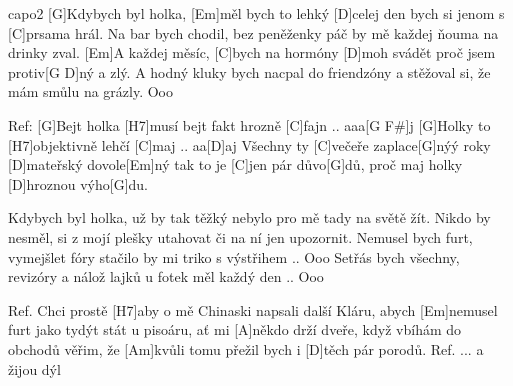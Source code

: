 \hfill capo2
[G]Kdybych byl holka, [Em]měl bych to lehký
[D]celej den bych si jenom s [C]prsama hrál.
Na bar bych chodil, bez peněženky
páč by mě každej ňouma na drinky zval.
[Em]A každej měsíc, [C]bych na hormóny
[D]moh svádět proč jsem protiv[G D]ný a zlý.
A hodný kluky bych nacpal do friendzóny
a stěžoval si, že mám smůlu na grázly. Ooo

Ref:
[G]Bejt holka [H7]musí bejt fakt hrozně [C]fajn .. aaa[G F#]j
[G]Holky to [H7]objektivně lehčí [C]maj .. aa[D]aj
Všechny ty [C]večeře zaplace[G]nýý
roky [D]mateřský dovole[Em]ný tak to je
[C]jen pár důvo[G]dů, proč maj holky [D]hroznou výho[G]du.

Kdybych byl holka, už by tak těžký
nebylo pro mě tady na světě žít.
Nikdo by nesměl, si z mojí plešky
utahovat či na ní jen upozornit.
Nemusel bych furt, vymejšlet fóry
stačilo by mi triko s výstřihem .. Ooo
Setřás bych všechny, revizóry
a nálož lajků u fotek měl každý den .. Ooo

Ref.
Chci prostě [H7]aby o mě Chinaski napsali další Kláru,
abych [Em]nemusel furt jako tydýt stát u pisoáru,
ať mi [A]někdo drží dveře, když vbíhám do obchodů
věřim, že [Am]kvůli tomu přežil bych i [D]těch pár porodů.
Ref. ... a žijou dýl